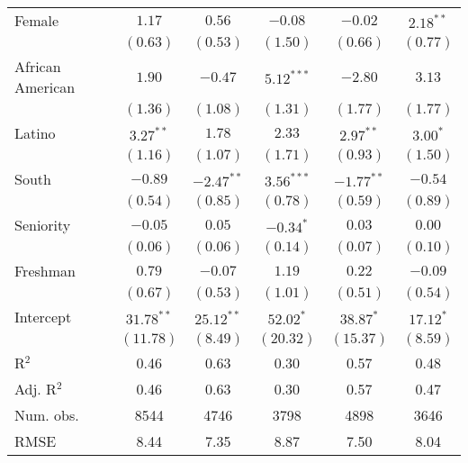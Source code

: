 \documentclass[12pt]{article}
\begin{document}
\begin{table}[H]
\begin{threeparttable}
\begin{tabular}{l c c c c c }
Female                & $1.17$       & $0.56$       & $-0.08$      & $-0.02$       & $2.18^{**}$  \\
                      & $(0.63)$     & $(0.53)$     & $(1.50)$     & $(0.66)$      & $(0.77)$     \\
African American      & $1.90$       & $-0.47$      & $5.12^{***}$ & $-2.80$       & $3.13$       \\
                      & $(1.36)$     & $(1.08)$     & $(1.31)$     & $(1.77)$      & $(1.77)$     \\
Latino                & $3.27^{**}$  & $1.78$       & $2.33$       & $2.97^{**}$   & $3.00^{*}$   \\
                      & $(1.16)$     & $(1.07)$     & $(1.71)$     & $(0.93)$      & $(1.50)$     \\
South                 & $-0.89$      & $-2.47^{**}$ & $3.56^{***}$ & $-1.77^{**}$  & $-0.54$      \\
                      & $(0.54)$     & $(0.85)$     & $(0.78)$     & $(0.59)$      & $(0.89)$     \\
Seniority             & $-0.05$      & $0.05$       & $-0.34^{*}$  & $0.03$        & $0.00$       \\
                      & $(0.06)$     & $(0.06)$     & $(0.14)$     & $(0.07)$      & $(0.10)$     \\
Freshman              & $0.79$       & $-0.07$      & $1.19$       & $0.22$        & $-0.09$      \\
                      & $(0.67)$     & $(0.53)$     & $(1.01)$     & $(0.51)$      & $(0.54)$     \\
Intercept             & $31.78^{**}$ & $25.12^{**}$ & $52.02^{*}$  & $38.87^{*}$   & $17.12^{*}$  \\
                      & $(11.78)$    & $(8.49)$     & $(20.32)$    & $(15.37)$     & $(8.59)$     \\
\hline
R$^2$                 & 0.46         & 0.63         & 0.30         & 0.57          & 0.48         \\
Adj. R$^2$            & 0.46         & 0.63         & 0.30         & 0.57          & 0.47         \\
Num. obs.             & 8544         & 4746         & 3798         & 4898          & 3646         \\
RMSE                  & 8.44         & 7.35         & 8.87         & 7.50          & 8.04         \\
\hline
\end{tabular}

\end{threeparttable}
\end{table}
\end{document}
